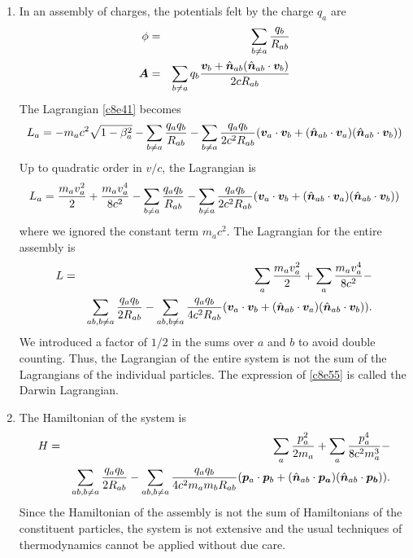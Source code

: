 \begin{enumerate}
\item In an assembly of charges, the potentials felt by the charge $q_a$ are
\begin{eqnarray*}
\phi &=& \sum_{b \ne a} \frac{q_b}{R_{ab}} \\
\bm{A}&=&\sum_{b \ne a} 
q_b\frac{\bm{v}_b+\hat{\bm{n}}_{ab}(\hat{\bm{n}}_{ab}\cdot\bm{v}_b)}{2cR_{ab}}
\end{eqnarray*}
The Lagrangian \eqref{c8e41} becomes
\[
L_a = -m_ac^2\sqrt{1 - \beta_a^2} - \sum_{b \ne a}\frac{q_aq_b}{R_{ab}} - 
\sum_{b \ne a} \frac{q_aq_b}{2c^2R_{ab}}(\bm{v}_a\cdot\bm{v}_b + 
(\hat{\bm{n}}_{ab}\cdot\bm{v}_a) (\hat{\bm{n}}_{ab}\cdot\bm{v}_b))
\]
Up to quadratic order in $v/c$, the Lagrangian is
\begin{equation}\label{c8e54}
L_a = \frac{m_av_a^2}{2}+\frac{m_av_a^4}{8c^2}-\sum_{b \ne a}\frac{q_aq_b}{R_{ab}}- 
\sum_{b \ne a} \frac{q_aq_b}{2c^2R_{ab}}(\bm{v}_a\cdot\bm{v}_b + 
(\hat{\bm{n}}_{ab}\cdot\bm{v}_a)(\hat{\bm{n}}_{ab}\cdot\bm{v}_b))
\end{equation}
where we ignored the constant term $m_ac^2$. The Lagrangian for the entire 
assembly is
\begin{eqnarray*}
L &=& \sum_a\frac{m_av_a^2}{2} + \sum_a\frac{m_av_a^4}{8c^2} - \nonumber \\
 & & \sum_{ab, b \ne a}\frac{q_aq_b}{2R_{ab}} -  
\sum_{ab, b \ne a} \frac{q_aq_b}{4c^2R_{ab}}(\bm{v}_a\cdot\bm{v}_b + 
(\hat{\bm{n}}_{ab}\cdot\bm{v}_a)(\hat{\bm{n}}_{ab}\cdot\bm{v}_b)).\label{c8e55}
\end{eqnarray*}
We introduced a factor of $1/2$ in the sums over $a$ and $b$ to avoid double
counting. Thus, the Lagrangian of the entire system is not the sum of the 
Lagrangians of the individual particles. The expression of \eqref{c8e55} is 
called the Darwin Lagrangian.

\item The Hamiltonian of the system is
\begin{eqnarray*}
H &=& \sum_a\frac{p_a^2}{2m_a} + \sum_a\frac{p_a^4}{8c^2m_a^3} - \nonumber \\
 & & \sum_{ab, b \ne a}\frac{q_aq_b}{2R_{ab}} -  
\sum_{ab, b \ne a} \frac{q_aq_b}{4c^2m_am_bR_{ab}}(\bm{p}_a\cdot\bm{p}_b + 
(\hat{\bm{n}}_{ab}\cdot\bm{p_a})(\hat{\bm{n}}_{ab}\cdot\bm{p_b})).\label{c8e55}
\end{eqnarray*}
Since the Hamiltonian of the assembly is not the sum of Hamiltonians of the
constituent particles, the system is not extensive and the usual techniques of
thermodynamics cannot be applied without due care.
\end{enumerate}

